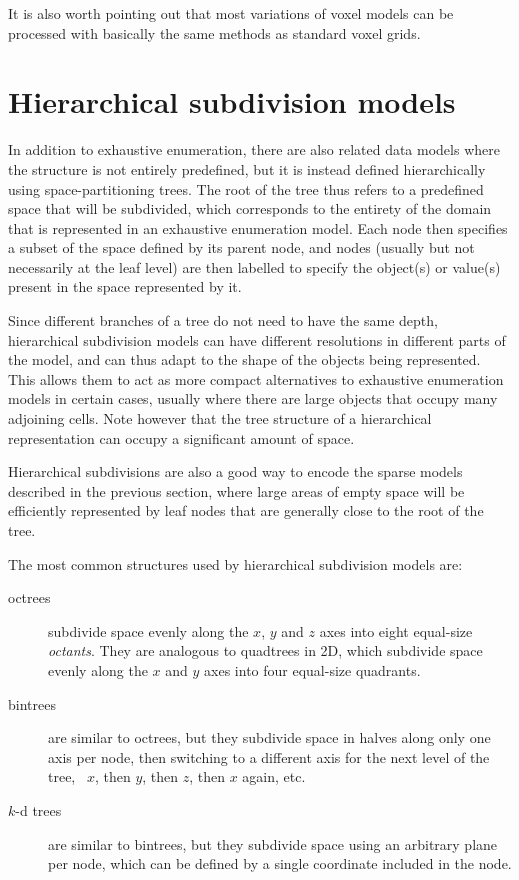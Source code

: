 It is also worth pointing out that most variations of voxel models can be processed with basically the same methods as standard voxel grids.

\section{Hierarchical subdivision models}

In addition to exhaustive enumeration, there are also related data models where the structure is not entirely predefined, but it is instead defined hierarchically using space-partitioning trees.
The root of the tree thus refers to a predefined space that will be subdivided, which corresponds to the entirety of the domain that is represented in an exhaustive enumeration model.
Each node then specifies a subset of the space defined by its parent node, and nodes (usually but not necessarily at the leaf level) are then labelled to specify the object(s) or value(s) present in the space represented by it.

Since different branches of a tree do not need to have the same depth, hierarchical subdivision models can have different resolutions in different parts of the model, and can thus adapt to the shape of the objects being represented.
This allows them to act as more compact alternatives to exhaustive enumeration models in certain cases, usually where there are large objects that occupy many adjoining cells.
Note however that the tree structure of a hierarchical representation can occupy a significant amount of space.

Hierarchical subdivisions are also a good way to encode the sparse models described in the previous section, where large areas of empty space will be efficiently represented by leaf nodes that are generally close to the root of the tree.

The most common structures used by hierarchical subdivision models are:

\begin{description}

\item[octrees] subdivide space evenly along the \(x\), \(y\) and \(z\) axes into eight equal-size \emph{octants}.
They are analogous to quadtrees in 2D, which subdivide space evenly along the \(x\) and \(y\) axes into four equal-size quadrants.

\item[bintrees] are similar to octrees, but they subdivide space in halves along only one axis per node, then switching to a different axis for the next level of the tree, \eg\ \(x\), then \(y\), then \(z\), then \(x\) again, etc.

\item[\(k\)-d trees] are similar to bintrees, but they subdivide space using an arbitrary plane per node, which can be defined by a single coordinate included in the node.

\end{description}

